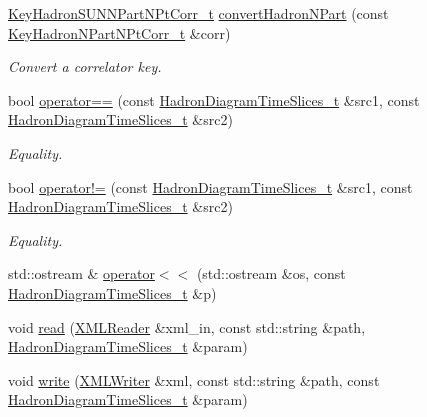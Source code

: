 \begin{DoxyCompactItemize}
\mbox{\hyperlink{structHadron_1_1KeyHadronSUNNPartNPtCorr__t}{Key\+Hadron\+S\+U\+N\+N\+Part\+N\+Pt\+Corr\+\_\+t}} \mbox{\hyperlink{namespaceHadron_af69200410e93c702cf9e19f0c220bbef}{convert\+Hadron\+N\+Part}} (const \mbox{\hyperlink{structHadron_1_1KeyHadronNPartNPtCorr__t}{Key\+Hadron\+N\+Part\+N\+Pt\+Corr\+\_\+t}} \&corr)
\begin{DoxyCompactList}\small\item\em Convert a correlator key. \end{DoxyCompactList}\item 
bool \mbox{\hyperlink{namespaceHadron_a9eb9233a6f185d9919fc72243524ee67}{operator==}} (const \mbox{\hyperlink{structHadron_1_1HadronDiagramTimeSlices__t}{Hadron\+Diagram\+Time\+Slices\+\_\+t}} \&src1, const \mbox{\hyperlink{structHadron_1_1HadronDiagramTimeSlices__t}{Hadron\+Diagram\+Time\+Slices\+\_\+t}} \&src2)
\begin{DoxyCompactList}\small\item\em Equality. \end{DoxyCompactList}\item 
bool \mbox{\hyperlink{namespaceHadron_a795c74aad8519c0dc1b46c0e3c44f095}{operator!=}} (const \mbox{\hyperlink{structHadron_1_1HadronDiagramTimeSlices__t}{Hadron\+Diagram\+Time\+Slices\+\_\+t}} \&src1, const \mbox{\hyperlink{structHadron_1_1HadronDiagramTimeSlices__t}{Hadron\+Diagram\+Time\+Slices\+\_\+t}} \&src2)
\begin{DoxyCompactList}\small\item\em Equality. \end{DoxyCompactList}\item 
std\+::ostream \& \mbox{\hyperlink{namespaceHadron_a7fed56ec5f5f96e9e160939d5b138184}{operator$<$$<$}} (std\+::ostream \&os, const \mbox{\hyperlink{structHadron_1_1HadronDiagramTimeSlices__t}{Hadron\+Diagram\+Time\+Slices\+\_\+t}} \&p)
\item 
void \mbox{\hyperlink{namespaceHadron_ae5cdeeff0a8ced82bfb5f5a46595faf8}{read}} (\mbox{\hyperlink{classADATXML_1_1XMLReader}{X\+M\+L\+Reader}} \&xml\+\_\+in, const std\+::string \&path, \mbox{\hyperlink{structHadron_1_1HadronDiagramTimeSlices__t}{Hadron\+Diagram\+Time\+Slices\+\_\+t}} \&param)
\item 
void \mbox{\hyperlink{namespaceHadron_ac03bbcefc730bcb21021dc5c45a1b365}{write}} (\mbox{\hyperlink{classADATXML_1_1XMLWriter}{X\+M\+L\+Writer}} \&xml, const std\+::string \&path, const \mbox{\hyperlink{structHadron_1_1HadronDiagramTimeSlices__t}{Hadron\+Diagram\+Time\+Slices\+\_\+t}} \&param)
\item 

\end{DoxyCompactItemize}
